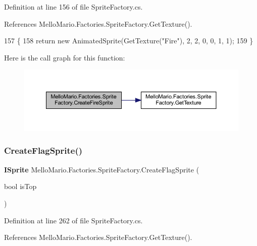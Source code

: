 Definition at line 156 of file Sprite\+Factory.\+cs.



References Mello\+Mario.\+Factories.\+Sprite\+Factory.\+Get\+Texture().


\begin{DoxyCode}
157         \{
158             \textcolor{keywordflow}{return} \textcolor{keyword}{new} AnimatedSprite(GetTexture(\textcolor{stringliteral}{"Fire"}), 2, 2, 0, 0, 1, 1);
159         \}
\end{DoxyCode}
Here is the call graph for this function\+:
\nopagebreak
\begin{figure}[H]
\begin{center}
\leavevmode
\includegraphics[width=350pt]{classMelloMario_1_1Factories_1_1SpriteFactory_a70f7b0e681f40656b64a0109b90f7921_cgraph}
\end{center}
\end{figure}
\mbox{\label{classMelloMario_1_1Factories_1_1SpriteFactory_a2324945ad4d8e3cd9d8d58abd2455148}} 
\subsubsection{Create\+Flag\+Sprite()}
{\footnotesize\ttfamily \textbf{ I\+Sprite} Mello\+Mario.\+Factories.\+Sprite\+Factory.\+Create\+Flag\+Sprite (\begin{DoxyParamCaption}\item[{bool}]{is\+Top }\end{DoxyParamCaption})}



Definition at line 262 of file Sprite\+Factory.\+cs.



References Mello\+Mario.\+Factories.\+Sprite\+Factory.\+Get\+Texture().


